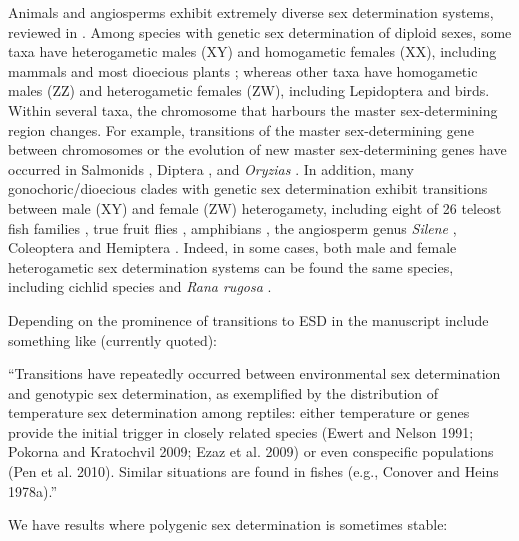 \documentclass[12pt]{article}
\begin{document}
Animals and angiosperms exhibit extremely diverse sex determination systems, reviewed in \citet{Bull:1983vi,Charlesworth:2010it,Beukeboom:2014vb,Bachtrog:2014bx}. 
Among species with genetic sex determination of diploid sexes, some taxa have heterogametic males (XY) and homogametic females (XX), including %
mammals and most dioecious plants \citep{Ming:2011iy}; whereas other taxa have homogametic males (ZZ) and heterogametic females (ZW), including Lepidoptera and birds. 
Within several taxa, the chromosome that harbours the master sex-determining region changes. 
For example, transitions of the master sex-determining gene between chromosomes or the evolution of new master sex-determining genes have occurred in Salmonids \citep{Li:2011fm,Yano:2012di}, Diptera \citep{Vicoso:2015hf}, and \textit{Oryzias} \citep{Myosho:2012fv}.
In addition, many gonochoric/dioecious clades with genetic sex determination exhibit transitions between male (XY) and female (ZW) heterogamety, including eight of 26 teleost fish families \citep{Mank:2006bt}, true fruit flies \citep[Tephritids,][]{Vicoso:2015hf}, amphibians \citep{Hillis:1990gu}, the angiosperm genus \textit{Silene} \citep{Slancarova:2013dq}, Coleoptera and Hemiptera \citep[][plate 2]{Beukeboom:2014vb}.
Indeed, in some cases, both male and female heterogametic sex determination systems can be found the same species, including cichlid species \citep{Ser:2010iq} and \textit{Rana rugosa} \citep{Ogata:2007jm}.

\noindent
Depending on the prominence of transitions to ESD in the manuscript include something like (currently quoted):

``Transitions have repeatedly occurred between environmental sex determination and genotypic sex determination, as exemplified by the distribution of temperature sex determination among reptiles: either temperature or genes provide the initial trigger in closely related species (Ewert and Nelson 1991; Pokorna and Kratochvil 2009; Ezaz et al. 2009) or even conspecific populations (Pen et al. 2010). Similar situations are found in fishes (e.g., Conover and Heins 1978a).''

\noindent
We have results where polygenic sex determination is sometimes stable:
\end{document}
